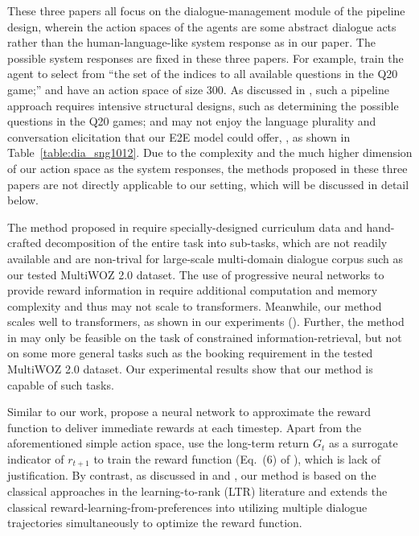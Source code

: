These three papers all focus on the dialogue-management module of the pipeline design, wherein the action spaces of the agents are some abstract dialogue acts rather than the human-language-like system response as in our paper.
The possible system responses are fixed in these three papers.
For example, \citet{hu2018playing} train the agent to select from ``the set of the indices to all available questions in the Q20 game;'' and \citet{li2020guided} have an action space of size $300$.
As discussed in , such a pipeline approach requires intensive structural designs, such as determining the possible questions in the Q20 games; and may not enjoy the language plurality and conversation elicitation that our E2E model could offer, \eg, as shown in
Table~\ref{table:dia_sng1012}.
Due to the complexity and the much higher dimension of our action space as the system responses, the methods proposed in these three papers are not directly applicable to our setting, which will be discussed in detail below.



The  method proposed in \citet{saito2018curriculum} require specially-designed curriculum data and hand-crafted decomposition of the entire task into sub-tasks, which are not readily available and are non-trival for large-scale multi-domain dialogue corpus such as our tested MultiWOZ 2.0 dataset.
The use of progressive neural networks to provide reward information in \citet{saito2018curriculum} require additional computation and memory complexity and thus may not scale to transformers. 
Meanwhile, our method scales well to transformers, as shown in our experiments ().
Further, the method in \citet{saito2018curriculum} may  only be feasible on the task of constrained information-retrieval, but not on some more general tasks such as the booking requirement in the tested MultiWOZ 2.0 dataset.
Our experimental results show that our method is capable of such tasks.



Similar to our work, \citet{hu2018playing} propose a neural network to approximate the reward function to deliver immediate rewards at each timestep.
Apart from the aforementioned simple action space, \citet{hu2018playing} use the long-term return $G_t$ as a surrogate indicator of $r_{t+1}$ to train the reward function (Eq.~(6) of \citet{hu2018playing}), which is lack of justification.
By contrast, as discussed in  and , our method is based on the classical
approaches in the learning-to-rank (LTR) literature and extends the classical reward-learning-from-preferences into utilizing multiple dialogue trajectories simultaneously to optimize the reward function.


